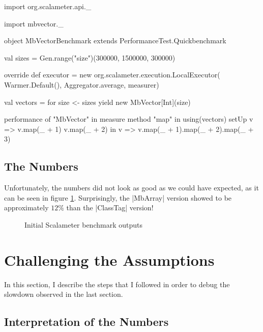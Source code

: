 \begin{lstlisting-nobreak}
import org.scalameter.api._

import mbvector._

object MbVectorBenchmark extends PerformanceTest.Quickbenchmark {
  val sizes = Gen.range("size")(300000, 1500000, 300000)

  override def executor = new org.scalameter.execution.LocalExecutor(
    Warmer.Default(),
    Aggregator.average,
    measurer)

  val vectors = for {
    size <- sizes
  } yield new MbVector[Int](size)

  performance of "MbVector" in {
    measure method "map" in {
      using(vectors) setUp {
        v => 
          v.map(_ + 1)
          v.map(_ + 2)
      } in {
        v => v.map(_ + 1).map(_ + 2).map(_ + 3)
      }
    }
  }
}
\end{lstlisting-nobreak}

\subsection{The Numbers}

Unfortunately, the numbers did not look as good as we could have expected, as it can be seen in figure \ref{fig:InitCTvsMB}.
Surprisingly, the |MbArray| version showed to be approximately $12\%$ than the |ClassTag| version!

\begin{figure}
\centering
{}
\caption{Initial Scalameter benchmark outputs}\label{fig:BenchOuts}
\label{fig:InitCTvsMB}
\end{figure} 

\section{Challenging the Assumptions}

In this section, I describe the steps that I followed in order to debug the slowdown observed in the last section.

\subsection{Interpretation of the Numbers}

